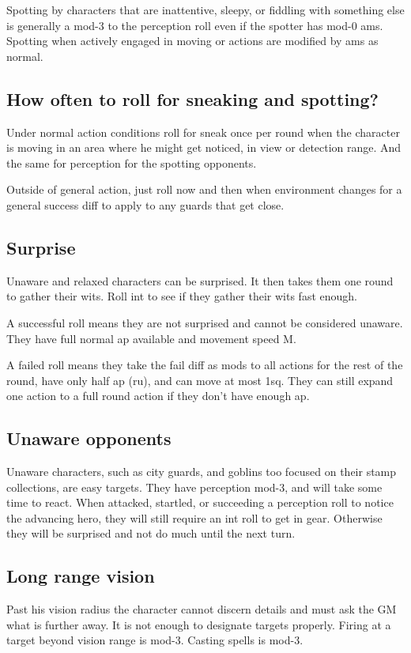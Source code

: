 Spotting by characters that are inattentive, sleepy, or fiddling with something else is generally a mod-3 to the perception roll even if the spotter has mod-0 ams. Spotting when actively engaged in moving or actions are modified by ams as normal.


\subsection*{How often to roll for sneaking and spotting?}
Under normal action conditions roll for sneak once per round when the character is moving in an area where he might get noticed, in view or detection range. And the same for perception for the spotting opponents.

Outside of general action, just roll now and then when environment changes for a general success diff to apply to any guards that get close.


\subsection*{Surprise}
\label{sec:surprise}
Unaware and relaxed characters can be surprised. It then takes them one round to gather their wits. Roll int to see if they gather their wits fast enough.

A successful roll means they are not surprised and cannot be considered unaware. They have full normal ap available and movement speed M.

A failed roll means they take the fail diff as mods to all actions for the rest of the round, have only half ap (ru), and can move at most 1sq. They can still expand one action to a full round action if they don't have enough ap.


\subsection*{Unaware opponents}
\label{sec:unaware}
Unaware characters, such as city guards, and goblins too focused on their stamp collections, are easy targets. They have perception mod-3, and will take some time to react. When attacked, startled, or succeeding a perception roll to notice the advancing hero, they will still require an int roll to get in gear. Otherwise they will be surprised and not do much until the next turn.


\subsection*{Long range vision}
Past his vision radius the character cannot discern details and must ask the GM what is further away. It is not enough to designate targets properly. Firing at a target beyond vision range is mod-3. Casting spells is mod-3.













